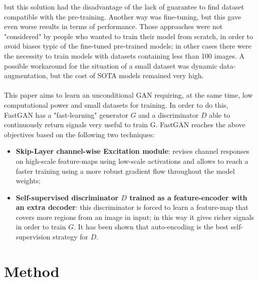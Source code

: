 \documentclass[12pt]{article}
\begin{document}
	but this solution had the disadvantage of the lack of guarantee to find dataset compatible with the pre-training. 
	Another way was fine-tuning, but this gave even worse results in terms of performance.
	Those approaches were not "considered" by people who wanted to train their model from scratch, in order to 
	avoid biases typic of the fine-tuned pre-trained models; in other cases there were the necessity to train models
	with datasets containing less than 100 images.
	A possible workaround for the situation of a small dataset was dynamic data-augmentation, but the cost of SOTA models
	remained very high.\\\\
	This paper aims to learn an unconditional GAN requiring, at the same time, low computational power and small datasets
	for training. In order to do this, FastGAN has a "fast-learning" generator $G$ and a discriminator $D$ able to continuously
	return signals very useful to train G. FastGAN reaches the above objectives based on the following two techniques:
	\begin{itemize}
		\setlength\itemsep{0.01em}
		\item \textbf{Skip-Layer channel-wise Excitation module}: revises channel responses on high-scale feature-maps using
			  low-scale activations and allows to reach a faster training using a more robust gradient flow throughout the 
			  model weights;
		\item \textbf{Self-supervised discriminator $D$ trained as a feature-encoder with an extra decoder}: this discriminator
			  is forced to learn a feature-map that covers more regions from an image in input; in this way it gives richer
			  signals in order to train $G$. It has been shown that auto-encoding is the best self-supervision strategy for $D$.
	\end{itemize} 


\section{Method}
\large	
\end{document}
